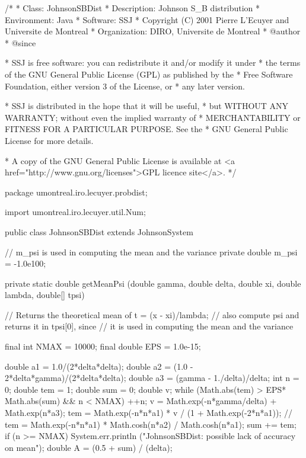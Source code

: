 \begin{code}
\begin{hide}
/*
 * Class:        JohnsonSBDist
 * Description:  Johnson S_B distribution
 * Environment:  Java
 * Software:     SSJ
 * Copyright (C) 2001  Pierre L'Ecuyer and Universite de Montreal
 * Organization: DIRO, Universite de Montreal
 * @author
 * @since

 * SSJ is free software: you can redistribute it and/or modify it under
 * the terms of the GNU General Public License (GPL) as published by the
 * Free Software Foundation, either version 3 of the License, or
 * any later version.

 * SSJ is distributed in the hope that it will be useful,
 * but WITHOUT ANY WARRANTY; without even the implied warranty of
 * MERCHANTABILITY or FITNESS FOR A PARTICULAR PURPOSE.  See the
 * GNU General Public License for more details.

 * A copy of the GNU General Public License is available at
   <a href="http://www.gnu.org/licenses">GPL licence site</a>.
 */
\end{hide}
package umontreal.iro.lecuyer.probdist;\begin{hide}
import umontreal.iro.lecuyer.util.Num;
\end{hide}

public class JohnsonSBDist extends JohnsonSystem\begin{hide} {
   // m_psi is used in computing the mean and the variance
   private double m_psi = -1.0e100;


   private static double getMeanPsi (double gamma, double delta,
                           double xi, double lambda, double[] tpsi) {
      // Returns the theoretical mean of t = (x - xi)/lambda;
      // also compute psi and returns it in tpsi[0], since
      // it is used in computing the mean and the variance

      final int NMAX = 10000;
      final double EPS = 1.0e-15;

      double a1 = 1.0/(2*delta*delta);
      double a2 = (1.0 - 2*delta*gamma)/(2*delta*delta);
      double a3 = (gamma - 1./delta)/delta;
      int n = 0;
      double tem = 1;
      double sum = 0;
      double v;
      while (Math.abs(tem) > EPS* Math.abs(sum) && n < NMAX) {
         ++n;
         v = Math.exp(-n*gamma/delta) + Math.exp(n*a3);
         tem = Math.exp(-n*n*a1) * v / (1 + Math.exp(-2*n*a1));
      //   tem = Math.exp(-n*n*a1) * Math.cosh(n*a2) / Math.cosh(n*a1);
         sum += tem;
      }
      if (n >= NMAX)
         System.err.println ("JohnsonSBDist:  possible lack of accuracy on mean");
      double A = (0.5 + sum) / (delta);

}}
\end{hide}
\end{code}
